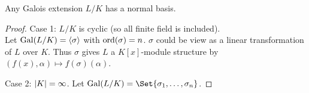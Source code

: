 \begin{theorem}
  Any Galois extension $L/K$ has a normal basis.

  \begin{proof}
    Case 1: $L/K$ is cyclic (so all finite field is included). \\
    Let $\operatorname{Gal}(L/K) = \langle \sigma \rangle$ with $\operatorname{ord}(\sigma) = n$. $\sigma$ could be view as
    a linear transformation of $L$ over $K$. Thus $\sigma$ gives $L$ a
    $K[x]$-module structure by $(f(x), \alpha) \mapsto f(\sigma)(\alpha)$.

    Case 2: $\lvert K\rvert = \infty$. Let $\Gal(L/K) = \Set{\sigma_1, \dots, \sigma_n}$.
  \end{proof}
\end{theorem}
